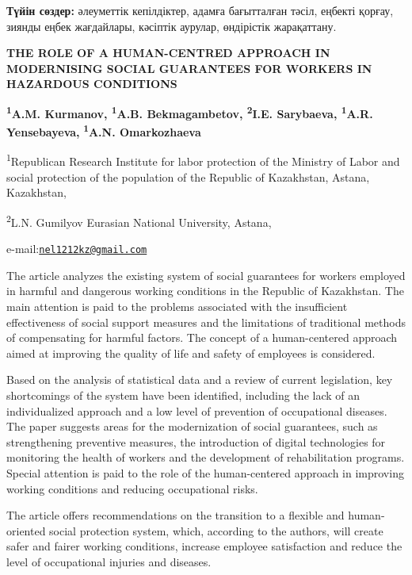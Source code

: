 {\bfseries Түйін сөздер:} әлеуметтік кепілдіктер, адамға бағытталған тәсіл,
еңбекті қорғау, зиянды еңбек жағдайлары, кәсіптік аурулар, өндірістік
жарақаттану.
\begin{articleheader}

{\bfseries THE ROLE OF A HUMAN-CENTRED APPROACH IN MODERNISING SOCIAL
GUARANTEES FOR WORKERS IN HAZARDOUS CONDITIONS}

{\bfseries \textsuperscript{1}A.M. Kurmanov, \textsuperscript{1}A.B.
Bekmagambetov, \textsuperscript{2}I.E. Sarybaeva,
\textsuperscript{1}A.R. Yensebayeva\textsuperscript{\envelope },}
{\bfseries \textsuperscript{1}A.N. Omarkozhaeva}
\end{articleheader}

\begin{affiliation}

\textsuperscript{1}Republican Research Institute for labor protection of
the Ministry of Labor and social protection of the population of the
Republic of Kazakhstan, Astana, Kazakhstan,

\textsuperscript{2}L.N. Gumilyov Eurasian National University, Astana,

e-mail:\href{mailto:nel1212kz@gmail.com}{\nolinkurl{nel1212kz@gmail.com}}
\end{affiliation}

The article analyzes the existing system of social guarantees for
workers employed in harmful and dangerous working conditions in the
Republic of Kazakhstan. The main attention is paid to the problems
associated with the insufficient effectiveness of social support
measures and the limitations of traditional methods of compensating for
harmful factors. The concept of a human-centered approach aimed at
improving the quality of life and safety of employees is considered.

Based on the analysis of statistical data and a review of current
legislation, key shortcomings of the system have been identified,
including the lack of an individualized approach and a low level of
prevention of occupational diseases. The paper suggests areas for the
modernization of social guarantees, such as strengthening preventive
measures, the introduction of digital technologies for monitoring the
health of workers and the development of rehabilitation programs.
Special attention is paid to the role of the human-centered approach in
improving working conditions and reducing occupational risks.

The article offers recommendations on the transition to a flexible and
human-oriented social protection system, which, according to the
authors, will create safer and fairer working conditions, increase
employee satisfaction and reduce the level of occupational injuries and
diseases.

